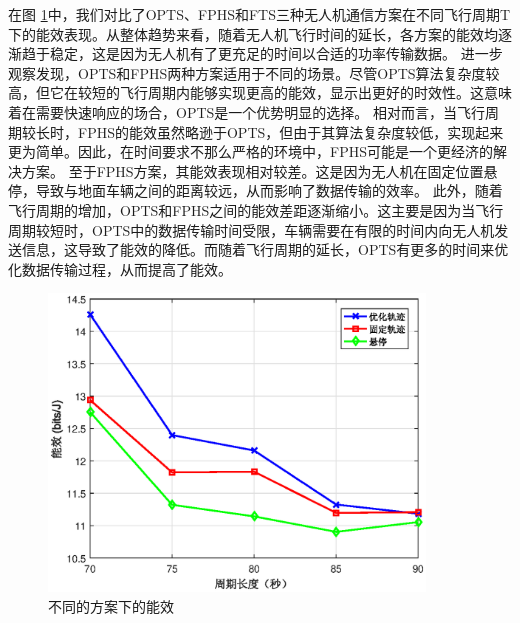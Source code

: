 在图 \ref{不同的方案下的能效}中，我们对比了OPTS、FPHS和FTS三种无人机通信方案在不同飞行周期T下的能效表现。从整体趋势来看，随着无人机飞行时间的延长，各方案的能效均逐渐趋于稳定，这是因为无人机有了更充足的时间以合适的功率传输数据。
进一步观察发现，OPTS和FPHS两种方案适用于不同的场景。尽管OPTS算法复杂度较高，但它在较短的飞行周期内能够实现更高的能效，显示出更好的时效性。这意味着在需要快速响应的场合，OPTS是一个优势明显的选择。
相对而言，当飞行周期较长时，FPHS的能效虽然略逊于OPTS，但由于其算法复杂度较低，实现起来更为简单。因此，在时间要求不那么严格的环境中，FPHS可能是一个更经济的解决方案。
至于FPHS方案，其能效表现相对较差。这是因为无人机在固定位置悬停，导致与地面车辆之间的距离较远，从而影响了数据传输的效率。
此外，随着飞行周期的增加，OPTS和FPHS之间的能效差距逐渐缩小。这主要是因为当飞行周期较短时，OPTS中的数据传输时间受限，车辆需要在有限的时间内向无人机发送信息，这导致了能效的降低。而随着飞行周期的延长，OPTS有更多的时间来优化数据传输过程，从而提高了能效。

\begin{figure}[H]
\centering
\includegraphics[width=10cm]{..//figures//chap4//不同的方案下的能效.eps}
\caption{不同的方案下的能效}
\label{不同的方案下的能效}
\end{figure}

